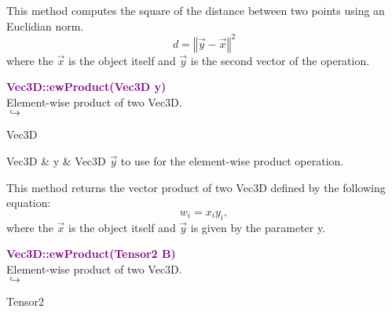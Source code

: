This method computes the square of the distance between two points using an Euclidian norm.
\begin{equation*}
d = {\left\Vert \overrightarrow{y} - \overrightarrow{x} \right\Vert}^2
\end{equation*}
where the $\overrightarrow{x}$ is the object itself and $\overrightarrow{y}$ is the second vector of the operation.

\textcolor{purple}{\textbf{Vec3D::ewProduct(Vec3D y)}}\label{Vec3D::ewProduct(Vec3D y)}\\
Element-wise product of two Vec3D.\\ \hspace*{5mm}$\hookrightarrow$
\vspace*{-2em}\begin{tcolorbox}[grow to left by=-1cm, width=\textwidth-1cm,myArgs,tabularx={l|R}]
Vec3D
\end{tcolorbox}

\begin{tcolorbox}[width=\textwidth,myArgs,tabularx={ll|R}]
Vec3D & y & Vec3D $\overrightarrow{y}$ to use for the element-wise product operation.
\end{tcolorbox}

This method returns the vector product of two Vec3D defined by the following equation:
\begin{equation*}
w_i = x_i y_i,
\end{equation*}
where the $\overrightarrow{x}$ is the object itself and $\overrightarrow{y}$ is given by the parameter y.

\textcolor{purple}{\textbf{Vec3D::ewProduct(Tensor2 B)}}\label{Vec3D::ewProduct(Tensor2 B)}\\
Element-wise product of two Vec3D.\\ \hspace*{5mm}$\hookrightarrow$
\vspace*{-2em}\begin{tcolorbox}[grow to left by=-1cm, width=\textwidth-1cm,myArgs,tabularx={l|R}]
Tensor2
\end{tcolorbox}

